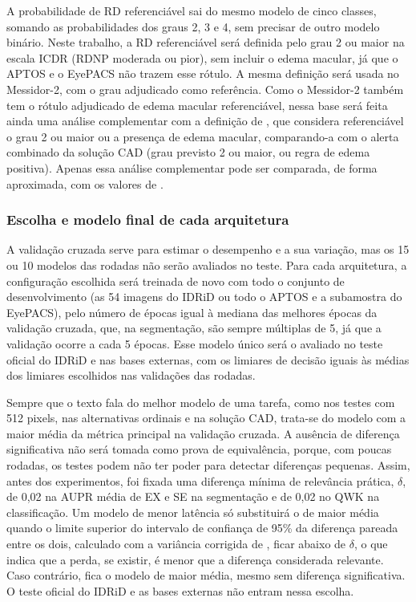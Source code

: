 A probabilidade de RD referenciável sai do mesmo modelo de cinco classes, somando as probabilidades dos graus 2, 3 e 4, sem precisar de outro modelo binário. Neste trabalho, a RD referenciável será definida pelo grau 2 ou maior na escala ICDR (RDNP moderada ou pior), sem incluir o edema macular, já que o APTOS e o EyePACS não trazem esse rótulo. A mesma definição será usada no Messidor-2, com o grau adjudicado como referência. Como o Messidor-2 também tem o rótulo adjudicado de edema macular referenciável, nessa base será feita ainda uma análise complementar com a definição de , que considera referenciável o grau 2 ou maior ou a presença de edema macular, comparando-a com o alerta combinado da solução CAD (grau previsto 2 ou maior, ou regra de edema positiva). Apenas essa análise complementar pode ser comparada, de forma aproximada, com os valores de .

\subsubsection{Escolha e modelo final de cada arquitetura}
\label{sec:modelo-final}

A validação cruzada serve para estimar o desempenho e a sua variação, mas os 15 ou 10 modelos das rodadas não serão avaliados no teste. Para cada arquitetura, a configuração escolhida será treinada de novo com todo o conjunto de desenvolvimento (as 54 imagens do IDRiD ou todo o APTOS e a subamostra do EyePACS), pelo número de épocas igual à mediana das melhores épocas da validação cruzada, que, na segmentação, são sempre múltiplas de 5, já que a validação ocorre a cada 5 épocas. Esse modelo único será o avaliado no teste oficial do IDRiD e nas bases externas, com os limiares de decisão iguais às médias dos limiares escolhidos nas validações das rodadas.

Sempre que o texto fala do melhor modelo de uma tarefa, como nos testes com 512 pixels, nas alternativas ordinais e na solução CAD, trata-se do modelo com a maior média da métrica principal na validação cruzada. A ausência de diferença significativa não será tomada como prova de equivalência, porque, com poucas rodadas, os testes podem não ter poder para detectar diferenças pequenas. Assim, antes dos experimentos, foi fixada uma diferença mínima de relevância prática, $\delta$, de 0,02 na AUPR média de EX e SE na segmentação e de 0,02 no QWK na classificação. Um modelo de menor latência só substituirá o de maior média quando o limite superior do intervalo de confiança de 95\% da diferença pareada entre os dois, calculado com a variância corrigida de , ficar abaixo de $\delta$, o que indica que a perda, se existir, é menor que a diferença considerada relevante. Caso contrário, fica o modelo de maior média, mesmo sem diferença significativa. O teste oficial do IDRiD e as bases externas não entram nessa escolha.

